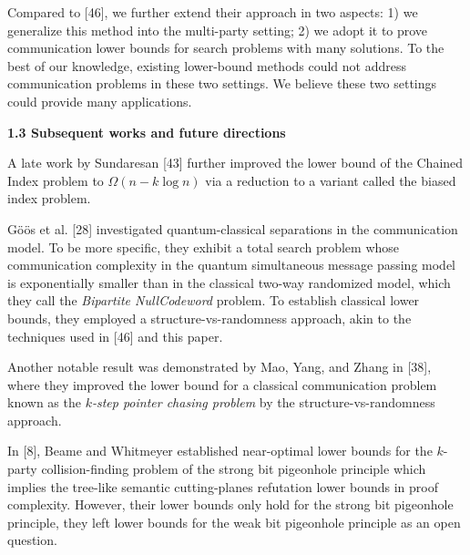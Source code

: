 \documentclass[10pt,a4paper]{article}
\begin{document}
Compared to [46], we further extend their approach in two aspects: 1) we generalize this method into the multi-party setting; 2) we adopt it to prove communication lower bounds for search problems with many solutions. To the best of our knowledge, existing lower-bound methods could not address communication problems in these two settings. We believe these two settings could provide many applications.\par






\par\medskip\noindent\textbf{
1.3 Subsequent works and future directions}\par




A late work by Sundaresan [43] further improved the lower bound of the Chained Index problem to $\Omega(n-k\log n)$ via a reduction to a variant called the biased index problem.\par




Göös et al. [28] investigated quantum-classical separations in the communication model. To be more specific, they exhibit a total search problem whose communication complexity in the quantum simultaneous message passing model is exponentially smaller than in the classical two-way
randomized model, which they call the \emph{Bipartite NullCodeword} problem. To establish classical lower bounds, they employed a structure-vs-randomness approach, akin to the techniques used in [46] and this paper.\par




Another notable result was demonstrated by Mao, Yang, and Zhang in [38], where they improved the lower bound for a classical communication problem known as the $k$\emph{-step pointer chasing problem} by the structure-vs-randomness approach.\par




In [8], Beame and Whitmeyer established near-optimal lower bounds for the $k$-party collision-finding problem of the strong bit pigeonhole principle which implies the tree-like semantic cutting-planes refutation lower bounds in proof complexity. However, their lower bounds only hold for the strong bit pigeonhole principle, they left lower bounds for the weak bit pigeonhole principle as an open question.\par
\end{document}
